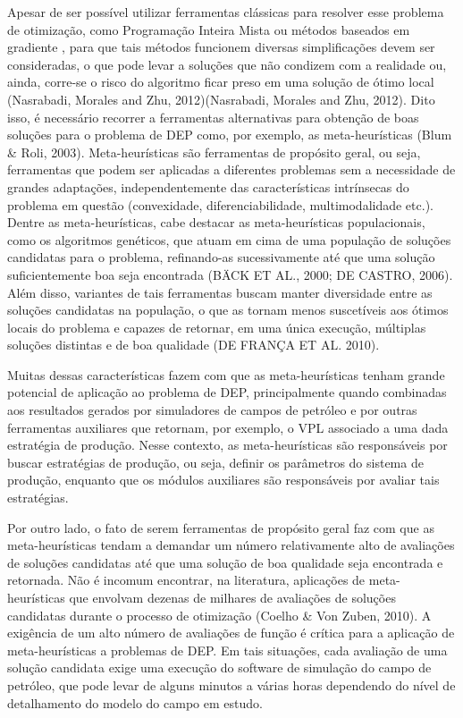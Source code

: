 Apesar de ser possível utilizar ferramentas clássicas para resolver esse problema de otimização, como Programação Inteira Mista \cite{Rosenwald1974} ou métodos baseados em gradiente \cite{Bangerth2006, Handels2007}, para que tais métodos funcionem diversas simplificações devem ser consideradas, o que pode levar a soluções que não condizem com a realidade ou, ainda, corre-se o risco do algoritmo ficar preso em uma solução de ótimo local (Nasrabadi, Morales and Zhu, 2012)(Nasrabadi, Morales and Zhu, 2012). Dito isso, é necessário recorrer a ferramentas alternativas para obtenção de boas soluções para o problema de DEP como, por exemplo, as meta-heurísticas (Blum \& Roli, 2003). Meta-heurísticas são ferramentas de propósito geral, ou seja, ferramentas que podem ser aplicadas a diferentes problemas sem a necessidade de grandes adaptações, independentemente das características intrínsecas do problema em questão (convexidade, diferenciabilidade, multimodalidade etc.).  Dentre as meta-heurísticas, cabe destacar as meta-heurísticas populacionais, como os algoritmos genéticos, que atuam em cima de uma população de soluções candidatas para o problema, refinando-as sucessivamente até que uma solução suficientemente boa seja encontrada (BÄCK ET AL., 2000; DE CASTRO, 2006). Além disso, variantes de tais ferramentas buscam manter diversidade entre as soluções candidatas na população, o que as tornam menos suscetíveis aos ótimos locais do problema e capazes de retornar, em uma única execução, múltiplas soluções distintas e de boa qualidade (DE FRANÇA ET AL. 2010).

Muitas dessas características fazem com que as meta-heurísticas tenham grande potencial de aplicação ao problema de DEP, principalmente quando combinadas aos resultados gerados por simuladores de campos de petróleo e por outras ferramentas auxiliares que retornam, por exemplo, o VPL associado a uma dada estratégia de produção. Nesse contexto, as meta-heurísticas são responsáveis por buscar estratégias de produção, ou seja, definir os parâmetros do sistema de produção, enquanto que os módulos auxiliares são responsáveis por avaliar tais estratégias.

Por outro lado, o fato de serem ferramentas de propósito geral faz com que as meta-heurísticas tendam a demandar um número relativamente alto de avaliações de soluções candidatas até que uma solução de boa qualidade seja encontrada e retornada. Não é incomum encontrar, na literatura, aplicações de meta-heurísticas que envolvam dezenas de milhares de avaliações de soluções candidatas durante o processo de otimização (Coelho \& Von Zuben, 2010). A exigência de um alto número de avaliações de função é crítica para a aplicação de meta-heurísticas a problemas de DEP. Em tais situações, cada avaliação de uma solução candidata exige uma execução do software de simulação do campo de petróleo, que pode levar de alguns minutos a várias horas dependendo do nível de detalhamento do modelo do campo em estudo. 

